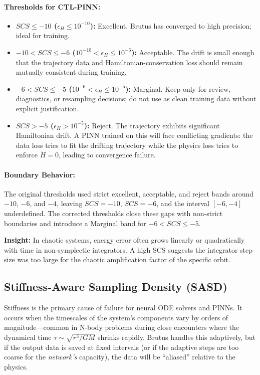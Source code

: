 \paragraph{Thresholds for CTL-PINN:}
\begin{itemize}
    \item \textbf{$SCS \leq -10$ ($\epsilon_H \leq 10^{-10}$):} Excellent. Brutus has converged to high precision; ideal for training.
    \item \textbf{$-10 < SCS \leq -6$ ($10^{-10} < \epsilon_H \leq 10^{-6}$):} Acceptable. The drift is small enough that the trajectory data and Hamiltonian-conservation loss should remain mutually consistent during training.
    \item \textbf{$-6 < SCS \leq -5$ ($10^{-6} < \epsilon_H \leq 10^{-5}$):} Marginal. Keep only for review, diagnostics, or resampling decisions; do not use as clean training data without explicit justification.
    \item \textbf{$SCS > -5$ ($\epsilon_H > 10^{-5}$):} Reject. The trajectory exhibits significant Hamiltonian drift. A PINN trained on this will face conflicting gradients: the data loss tries to fit the drifting trajectory while the physics loss tries to enforce $\dot{H}=0$, leading to convergence failure.
\end{itemize}

\paragraph{Boundary Behavior:}
The original thresholds used strict excellent, acceptable, and reject bands around $-10$, $-6$, and $-4$, leaving $SCS = -10$, $SCS = -6$, and the interval $[-6, -4]$ underdefined. The corrected thresholds close these gaps with non-strict boundaries and introduce a Marginal band for $-6 < SCS \leq -5$.

\textbf{Insight:} In chaotic systems, energy error often grows linearly or quadratically with time in non-symplectic integrators. A high SCS suggests the integrator step size was too large for the chaotic amplification factor of the specific orbit.

\subsection{Stiffness-Aware Sampling Density (SASD)}

Stiffness is the primary cause of failure for neural ODE solvers and PINNs. It occurs when the timescales of the system's components vary by orders of magnitude—common in N-body problems during close encounters where the dynamical time $\tau \sim \sqrt{r^3/GM}$ shrinks rapidly. Brutus handles this adaptively, but if the output data is saved at fixed intervals (or if the adaptive steps are too coarse for the \textit{network's} capacity), the data will be ``aliased'' relative to the physics.

